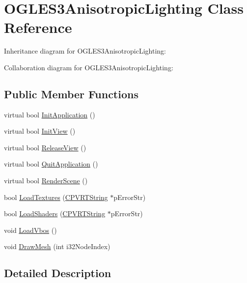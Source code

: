\hypertarget{class_o_g_l_e_s3_anisotropic_lighting}{\section{O\+G\+L\+E\+S3\+Anisotropic\+Lighting Class Reference}
\label{class_o_g_l_e_s3_anisotropic_lighting}
}


Inheritance diagram for O\+G\+L\+E\+S3\+Anisotropic\+Lighting\+:


Collaboration diagram for O\+G\+L\+E\+S3\+Anisotropic\+Lighting\+:
\subsection*{Public Member Functions}
\begin{DoxyCompactItemize}
\item 
virtual bool \hyperlink{class_o_g_l_e_s3_anisotropic_lighting_a5e7e2528c7bb12c1e7171f0b142a76bd}{Init\+Application} ()
\item 
virtual bool \hyperlink{class_o_g_l_e_s3_anisotropic_lighting_a48a255b40b2b6196d2beae43366595e4}{Init\+View} ()
\item 
virtual bool \hyperlink{class_o_g_l_e_s3_anisotropic_lighting_a630d1bfaff27c6adb7574951ac50fc5d}{Release\+View} ()
\item 
virtual bool \hyperlink{class_o_g_l_e_s3_anisotropic_lighting_af49919f98f23358732a1b580e420127f}{Quit\+Application} ()
\item 
virtual bool \hyperlink{class_o_g_l_e_s3_anisotropic_lighting_a6f7f2e49026f9456ab0d0019d5824354}{Render\+Scene} ()
\item 
bool \hyperlink{class_o_g_l_e_s3_anisotropic_lighting_aac7a75235270feba5975db818950b683}{Load\+Textures} (\hyperlink{class_c_p_v_r_t_string}{C\+P\+V\+R\+T\+String} $\ast$p\+Error\+Str)
\item 
bool \hyperlink{class_o_g_l_e_s3_anisotropic_lighting_a4b19629d0bf173dd5d2210924eadde77}{Load\+Shaders} (\hyperlink{class_c_p_v_r_t_string}{C\+P\+V\+R\+T\+String} $\ast$p\+Error\+Str)
\item 
void \hyperlink{class_o_g_l_e_s3_anisotropic_lighting_a5f84973d11bdf26ffed0ab3c477d7c61}{Load\+Vbos} ()
\item 
void \hyperlink{class_o_g_l_e_s3_anisotropic_lighting_a39b688dfdf5bb167d9380412ffc9297e}{Draw\+Mesh} (int i32\+Node\+Index)
\end{DoxyCompactItemize}


\subsection{Detailed Description}



